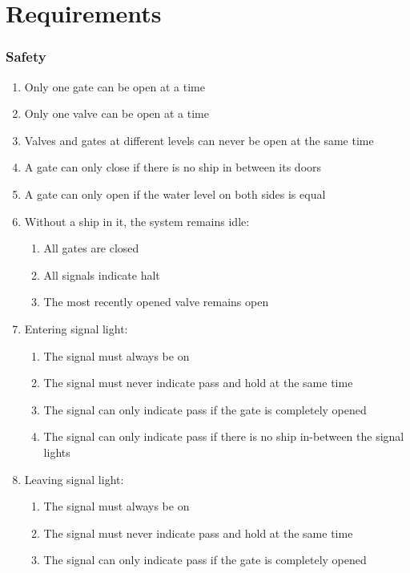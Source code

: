 \section{Requirements}
\subsubsection*{Safety}
\begin{enumerate}
	\item Only one gate can be open at a time
	\item Only one valve can be open at a time
	\item Valves and gates at different levels can never be open at the same time
	\item A gate can only close if there is no ship in between its doors
	\item A gate can only open if the water level on both sides is equal
	\item Without a ship in it, the system remains idle:
	\begin{enumerate}
		\item All gates are closed
		\item All signals indicate halt
		\item The most recently opened valve remains open
	\end{enumerate}
	\item Entering signal light:
	\begin{enumerate}
		\item The signal must always be on
		\item The signal must never indicate pass and hold at the same time
		\item The signal can only indicate pass if the gate is completely opened
		\item The signal can only indicate pass if there is no ship in-between the signal lights
	\end{enumerate}
	\item Leaving signal light:
	\begin{enumerate}
		\item The signal must always be on
		\item The signal must never indicate pass and hold at the same time
		\item The signal can only indicate pass if the gate is completely opened
	\end{enumerate}
\end{enumerate}
	
